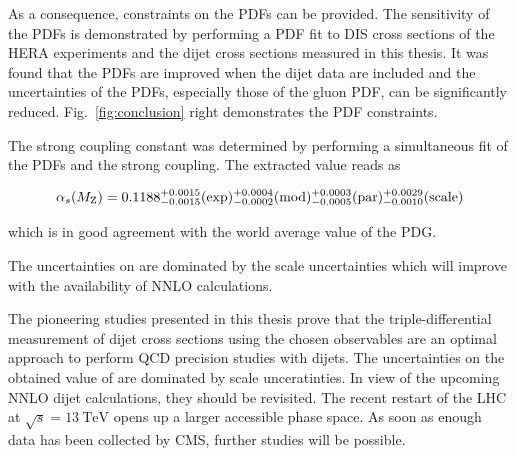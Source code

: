 As a consequence, constraints on the PDFs can be provided. The sensitivity of
the PDFs is demonstrated by performing a PDF fit to DIS cross sections of the
HERA experiments and the dijet cross sections measured in this thesis. It was
found that the PDFs are improved when the dijet data are included and the
uncertainties of the PDFs, especially those of the gluon PDF, can be
significantly reduced. Fig.~\ref{fig:conclusion} right demonstrates the PDF
constraints.

The strong coupling constant \asmz was determined by performing a simultaneous
fit of the PDFs and the strong coupling. The extracted value reads as

\begin{equation*}
  \alpha_{s}(M_\mathrm{Z}) = 0.1188_{-0.0015}^{+0.0015}(\mathrm{exp})_{-0.0002}^{+0.0004}(\mathrm{mod})_{-0.0005}^{+0.0003}(\mathrm{par})_{-0.0010}^{+0.0029}(\mathrm{scale})
\end{equation*}

which is in good agreement with the world average value of the PDG. 

The
uncertainties on \asmz are dominated by the scale uncertainties which will
improve with the availability of NNLO calculations.

The pioneering studies presented in this thesis prove that the triple-differential
measurement of dijet cross sections using the chosen observables are an optimal
approach to perform QCD precision studies with dijets. The uncertainties on the
obtained value of \asmz are dominated by scale unceratinties. In view of
the upcoming NNLO dijet calculations, they should be revisited. The recent
restart of the LHC at $\sqrt{s}=\SI{13}{\TeV}$ opens up a larger accessible
phase space. As soon as enough data has been collected by CMS, further studies
will be possible.

